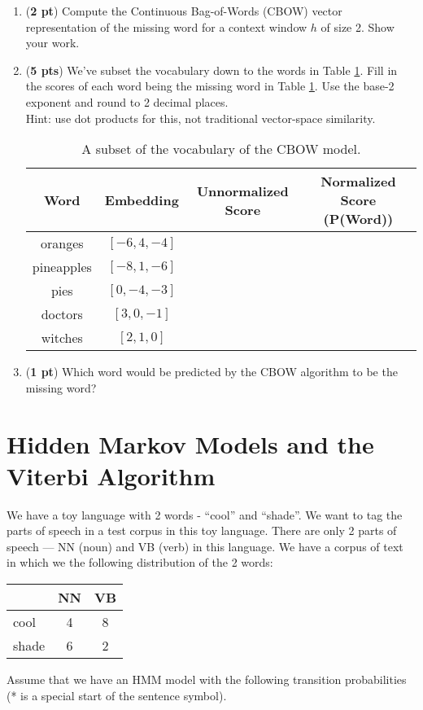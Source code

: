 \documentclass[11pt, letterpaper]{article}
\begin{document}
\begin{enumerate}
    \item (\textbf{2 pt}) Compute the Continuous Bag-of-Words (CBOW) vector representation of the missing word for a context window $h$ of size 2. Show your work.
    
    \item (\textbf{5 pts}) We've subset the vocabulary down to the words in Table \ref{tab:vocab}. Fill in the scores of each word being the missing word in Table \ref{tab:vocab}. Use the base-2 exponent and round to 2 decimal places.\\
    Hint: use dot products for this, not traditional vector-space similarity.
    
\begin{table}[H]
    \centering
    \begin{tabular}{|c|c|c|c|}
    \toprule
    \textbf{Word} & \textbf{Embedding} & \textbf{Unnormalized Score} & \textbf{Normalized Score (P(Word))}\\
    \midrule
    oranges & $[-6,4,-4]$ & & \\
    \hline
    pineapples & $[-8,1,-6]$ & & \\
    \hline
    pies & $[0,-4, -3]$ & & \\
    \hline
    doctors & $[3,0, -1]$ & & \\
    \hline
    witches & $[2,1,0]$ & & \\
    \bottomrule
    \end{tabular}
    \label{tab:vocab}
    \caption{A subset of the vocabulary of the CBOW model.}
\end{table}
    
    \item (\textbf{1 pt}) Which word would be predicted by the CBOW algorithm to be the missing word?

\end{enumerate}

\section{Hidden Markov Models and the Viterbi Algorithm}
    We have a toy language with 2 words - “cool” and “shade”. We want to tag the parts of speech in a test corpus in this toy language. There are only 2 parts of speech — NN (noun) and VB (verb) in this language. We have a corpus of text in which we the following distribution of the 2 words:
    
    \begin{table}[h!]
    \centering
    \small
    \begin{tabular}{|l | c | c |}
    \hline & NN & VB\\
    \hline
    cool & 4 & 8 \\
    shade & 6 & 2\\
    \hline
    \end{tabular}
    \end{table}
    Assume that we have an HMM model with the following transition probabilities (* is a special start of the sentence symbol).
    
\end{document}
